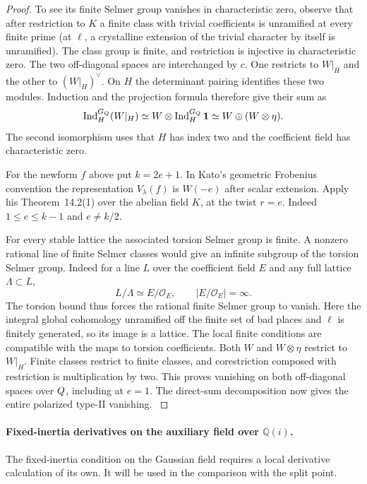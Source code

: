 \begin{proof}
To see its finite Selmer group vanishes in characteristic zero,
observe that after restriction to \(K\) a finite class with trivial
coefficients is unramified at every finite prime (at
\(\ell\), a crystalline extension of the trivial character
by itself is unramified). The class group is finite,
and restriction is injective in characteristic zero.
The two off-diagonal spaces are interchanged by \(c\).
One restricts to \(W|_H\) and the other to \((W|_H)^\vee\).
On \(H\) the determinant pairing identifies these two modules.
Induction and the projection formula therefore give their sum as
\[
 \operatorname{Ind}_{H}^{G_Q}(W|_H)
  \simeq W\otimes\operatorname{Ind}_{H}^{G_Q}\mathbf 1
  \simeq W\oplus(W\otimes\eta).
\]
The second isomorphism uses that \(H\) has index two and the
coefficient field has characteristic zero.

For the newform \(f\) above put \(k=2e+1\). In Kato's
geometric Frobenius convention the representation
\(V_\lambda(f)\) is \(W(-e)\) after scalar extension.
Apply his Theorem~14.2(1) over the abelian field \(K\),
at the twist \(r=e\). Indeed \(1\le e\le k-1\) and
\(e\ne k/2\).

For every stable lattice the associated
torsion Selmer group is finite. A nonzero rational line of finite Selmer classes would give an infinite subgroup of the torsion Selmer group. Indeed for a line \(L\) over the coefficient field \(E\) and any full lattice \(\Lambda\subset L\),
\[
 L/\Lambda\simeq E/\mathcal O_E,\qquad |E/\mathcal O_E|=\infty .
\]
The torsion bound thus forces the rational finite Selmer group to vanish. Here the
integral global cohomology unramified off the finite set
of bad places and \(\ell\) is finitely generated, so its
image is a lattice. The local finite conditions are
compatible with the maps to torsion coefficients. Both
\(W\) and \(W\otimes\eta\) restrict to \(W|_H\). Finite
classes restrict to finite classes, and corestriction
composed with restriction is multiplication by two.
This proves vanishing on both off-diagonal spaces over
\(Q\), including at \(e=1\). The direct-sum decomposition
now gives the entire polarized type-II vanishing.
\hfill\mbox{\cite{kato-modular,thorne-adjoint}}

\end{proof}

\paragraph{Fixed-inertia derivatives on the auxiliary field over \(\mathbb Q(i)\).}
The fixed-inertia condition on the Gaussian field requires a local derivative
calculation of its own. It will be used in the comparison with the split point.

